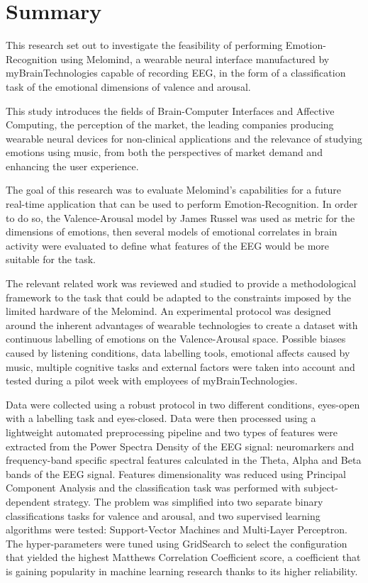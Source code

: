 \chapter{Summary}
\pagestyle{headings}

This research set out to investigate the feasibility of performing Emotion-Recognition using Melomind, a wearable neural interface manufactured by myBrainTechnologies capable of recording EEG, in the form of a classification task of the emotional dimensions of valence and arousal.

This study introduces the fields of Brain-Computer Interfaces and Affective Computing, the perception of the market, the leading companies producing wearable neural devices for non-clinical applications and the relevance of studying emotions using music, from both the perspectives of market demand and enhancing the user experience.

The goal of this research was to evaluate Melomind's capabilities for a future real-time application that can be used to perform Emotion-Recognition. In order to do so, the Valence-Arousal model by James Russel was used as metric for the dimensions of emotions, then several models of emotional correlates in brain activity were evaluated to define what features of the EEG would be more suitable for the task.

The relevant related work was reviewed and studied to provide a methodological framework to the task that could be adapted to the constraints imposed by the limited hardware of the Melomind. An experimental protocol was designed around the inherent advantages of wearable technologies to create a dataset with continuous labelling of emotions on the Valence-Arousal space. Possible biases caused by listening conditions, data labelling tools, emotional affects caused by music, multiple cognitive tasks and external factors were taken into account and tested during a pilot week with employees of myBrainTechnologies.

Data were collected using a robust protocol in two different conditions, eyes-open with a labelling task and eyes-closed. Data were then processed using a lightweight automated preprocessing pipeline and two types of features were extracted from the Power Spectra Density of the EEG signal: neuromarkers and frequency-band specific spectral features calculated in the Theta, Alpha and Beta bands of the EEG signal. Features dimensionality was reduced using Principal Component Analysis and the classification task was performed with subject-dependent strategy. The problem was simplified into two separate binary classifications tasks for valence and arousal, and two supervised learning algorithms were tested: Support-Vector Machines and Multi-Layer Perceptron. The hyper-parameters were tuned using GridSearch to select the configuration that yielded the highest Matthews Correlation Coefficient score, a coefficient that is gaining popularity in machine learning research thanks to its higher reliability. 

